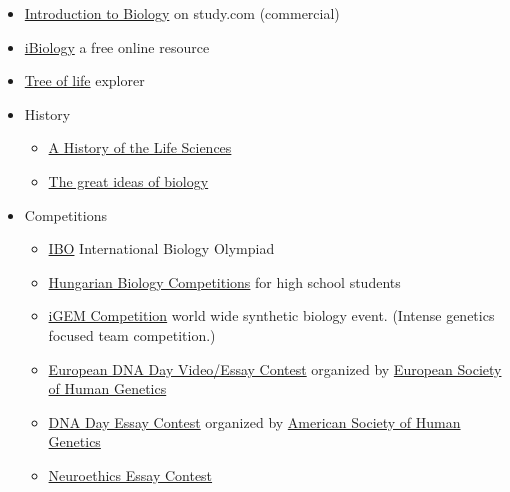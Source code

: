 \documentclass{article}
\begin{document}
\begin{itemize}
    \item \href{https://study.com/academy/course/introduction-to-biology.html}{Introduction to Biology} on study.com (commercial)
    
    \item \href{https://www.ibiology.org/}{iBiology} a free online resource 
    
    \item \href{https://www.onezoom.org/}{Tree of life} explorer
    
    \item History
    \begin{itemize}
    \item \href{https://www.goodreads.com/book/show/40951.A_History_of_the_Life_Sciences}{A History of the Life Sciences}
    \item \href{https://www.youtube.com/watch?v=llPMfaz4qnA}{The great ideas of biology}
    \end{itemize}
    \item Competitions
    \begin{itemize}
        \item \href{https://www.ibo-info.org/en/}{IBO} International Biology Olympiad
        \item \href{http://biologia.fazekas.hu/kozepiskolai-versenyek/}{Hungarian Biology Competitions} for high school students
        \item \href{https://igem.org/Competition}{iGEM Competition} world wide synthetic biology event. (Intense genetics focused team competition.)
        \item \href{https://www.dnaday.eu}{European DNA Day Video/Essay Contest} organized by \href{https://www.eshg.org/}{European Society of Human Genetics}
        \item \href{https://www.ashg.org/dna-day/}{DNA Day Essay Contest} organized by \href{https://www.ashg.org/}{American Society of Human Genetics}
        \item \href{https://www.neuroethicssociety.org/essay-call}{Neuroethics Essay Contest} 
    \end{itemize}
    

\end{itemize}
\end{document}
